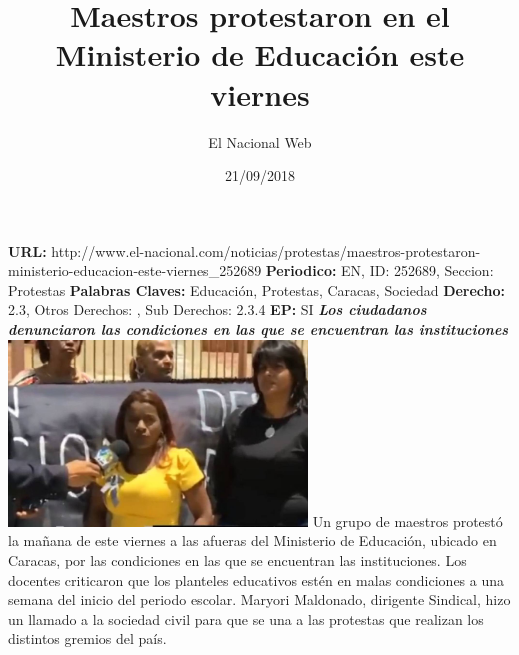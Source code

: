 \documentclass{article}%
\title{\textbf{Maestros protestaron en el Ministerio de Educación este viernes}}%
\author{El Nacional Web}%
\date{21/09/2018}%
\begin{document}
%
\normalsize%
\maketitle%
\textbf{URL: }%
http://www.el{-}nacional.com/noticias/protestas/maestros{-}protestaron{-}ministerio{-}educacion{-}este{-}viernes\_252689\newline%
%
\textbf{Periodico: }%
EN, %
ID: %
252689, %
Seccion: %
Protestas\newline%
%
\textbf{Palabras Claves: }%
Educación, Protestas, Caracas, Sociedad\newline%
%
\textbf{Derecho: }%
2.3, %
Otros Derechos: %
, %
Sub Derechos: %
2.3.4\newline%
%
\textbf{EP: }%
SI\newline%
\newline%
%
\textbf{\textit{Los ciudadanos denunciaron las condiciones en las que se encuentran las instituciones}}%
\newline%
\newline%
%
\includegraphics[width=300px]{87.jpg}%
\newline%
%
Un grupo de maestros protestó la mañana de este viernes a las afueras del Ministerio de Educación, ubicado en Caracas, por las condiciones en las que se encuentran las instituciones.%
\newline%
%
Los docentes criticaron que los planteles educativos estén en malas condiciones a una semana del inicio del periodo escolar.%
\newline%
%
Maryori Maldonado, dirigente Sindical, hizo un llamado a la sociedad civil para que se una a las protestas que realizan los distintos gremios del país.%
\newline%
%
\end{document}
